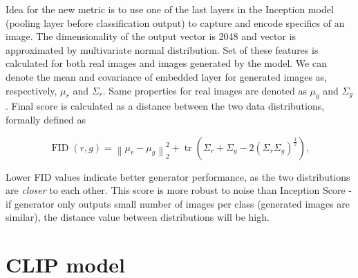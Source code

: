 \documentclass[12pt,a4paper,openany]{book}
\begin{document}
\noindent Idea for the new metric is to use one of the last layers in the Inception model (pooling layer before classification output) to capture and encode specifics of an image. The dimensionality of the output vector is 2048 and vector is approximated by multivariate normal distribution. Set of these features is calculated for both real images and images generated by the model. We can denote the mean and covariance of embedded layer for generated images as, respectively, $\mu_{r}$ and  $\Sigma_{r}$. Same properties for real images are denoted as $\mu_{g}$ and $\Sigma_{g}$. Final score is calculated as a distance between the two data distributions, formally defined as

\begin{equation}
\operatorname{FID}(r, g)=\left\|\mu_{r}-\mu_{g}\right\|_{2}^{2}+\operatorname{tr}\left(\Sigma_{r}+\Sigma_{g}-2\left(\Sigma_{r} \Sigma_{g}\right)^{\frac{1}{2}}\right),
\end{equation}

\noindent Lower FID values indicate better generator performance, as the two distributions are \textit{closer} to each other. This score is more robust to noise than Inception Score - if generator only outputs small number of images per class (generated images are similar), the distance value between distributions will be high.



\section{CLIP model}
\end{document}
